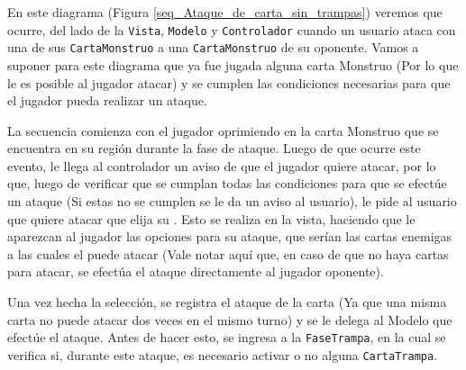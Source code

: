 	En este diagrama (Figura \ref{seq_Ataque_de_carta_sin_trampas}) veremos que ocurre, del lado de la \texttt{Vista}, \texttt{Modelo} y \texttt{Controlador} cuando un usuario ataca con una de sus \texttt{CartaMonstruo} a una \texttt{CartaMonstruo} de su oponente. Vamos a suponer para este diagrama que ya fue jugada alguna carta Monstruo (Por lo que le es posible al jugador atacar) y se cumplen las condiciones necesarias para que el jugador pueda realizar un ataque.
	
	La secuencia comienza con el jugador oprimiendo  en la carta Monstruo que se encuentra en su región durante la fase de ataque. Luego de que ocurre este evento, le llega al controlador un aviso de que el jugador quiere atacar, por lo que, luego de verificar que se cumplan todas las condiciones para que se efectúe un ataque (Si estas no se cumplen se le da un aviso al usuario), le pide al usuario que quiere atacar que elija su . Esto se realiza en la vista, haciendo que le aparezcan al jugador las opciones para su ataque, que serían las cartas enemigas a las cuales el puede atacar (Vale notar aquí que, en caso de que no haya cartas para atacar, se efectúa el ataque directamente al jugador oponente).
	
	Una vez hecha la selección, se registra el ataque de la carta (Ya que una misma carta no puede atacar dos veces en el mismo turno) y se le delega al Modelo que efectúe el ataque. Antes de hacer esto, se ingresa a la \texttt{FaseTrampa}, en la cual se verifica si, durante este ataque, es necesario activar o no alguna \texttt{CartaTrampa}.
	
